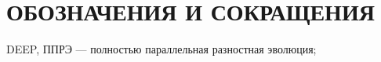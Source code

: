 \chapter*{ОБОЗНАЧЕНИЯ И СОКРАЩЕНИЯ}

\noindent DEEP, ППРЭ --- полностью параллельная разностная эволюция;

